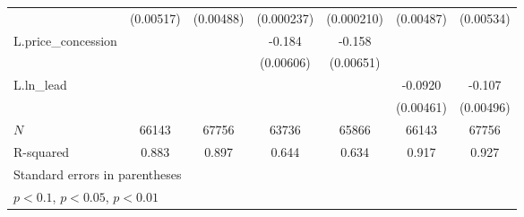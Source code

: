{\begin{tabular}{l*{6}{c}}
            &   (0.00517)         &   (0.00488)         &  (0.000237)         &  (0.000210)         &   (0.00487)         &   (0.00534)         \\
\addlinespace
L.price\_concession&                     &                     &      -0.184\sym{***}&      -0.158\sym{***}&                     &                     \\
            &                     &                     &   (0.00606)         &   (0.00651)         &                     &                     \\
\addlinespace
L.ln\_lead   &                     &                     &                     &                     &     -0.0920\sym{***}&      -0.107\sym{***}\\
            &                     &                     &                     &                     &   (0.00461)         &   (0.00496)         \\
\midrule
\(N\)       &       66143         &       67756         &       63736         &       65866         &       66143         &       67756         \\
R-squared   &       0.883         &       0.897         &       0.644         &       0.634         &       0.917         &       0.927         \\
\bottomrule
\multicolumn{7}{l}{\footnotesize Standard errors in parentheses}\\
\multicolumn{7}{l}{\footnotesize \sym{*} \(p<0.1\), \sym{**} \(p<0.05\), \sym{***} \(p<0.01\)}\\
\end{tabular}
}
